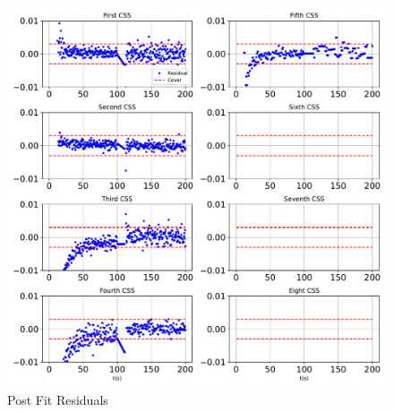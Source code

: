 \begin{figure}[htbp]\centerline{\includegraphics[height=0.9\textwidth, keepaspectratio]{AutoTeX/PostFit}}\caption{Post Fit Residuals}\label{fig:PostFit}\end{figure}